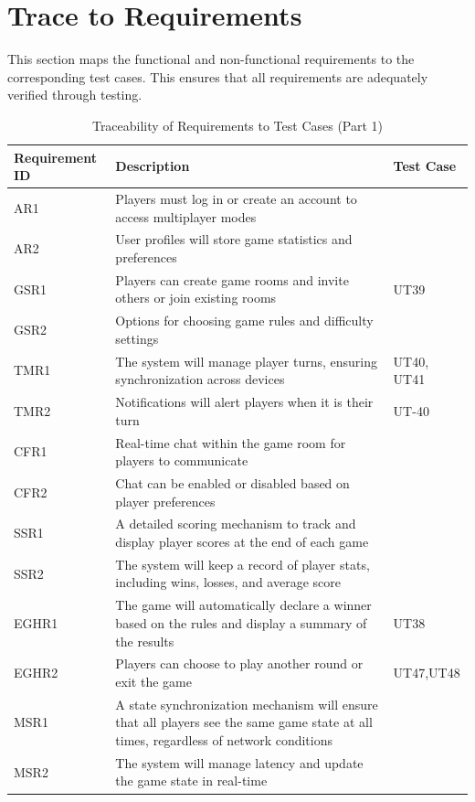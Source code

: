 \documentclass[12pt, titlepage]{article}
\begin{document}
\section{Trace to Requirements}

This section maps the functional and non-functional requirements to the corresponding test cases. This ensures that all requirements are adequately verified through testing.

\begin{table}[H]
    \centering
    \begin{tabularx}{\textwidth}{|l|X|l|}
        \hline
        \textbf{Requirement ID} & \textbf{Description} & \textbf{Test Case} \\
        \hline
        AR1 & Players must log in or create an account to access multiplayer modes &\\
        AR2 & User profiles will store game statistics and preferences &  \\
        GSR1 & Players can create game rooms and invite others or join existing rooms & UT39 \\
        GSR2 & Options for choosing game rules and difficulty settings &  \\
        TMR1 & The system will manage player turns, ensuring synchronization across devices & UT40, UT41 \\
        TMR2 & Notifications will alert players when it is their turn & UT-40 \\
        CFR1 & Real-time chat within the game room for players to communicate &  \\
        CFR2 & Chat can be enabled or disabled based on player preferences &  \\
        SSR1 & A detailed scoring mechanism to track and display player scores at the end of each game &  \\
        SSR2 & The system will keep a record of player stats, including wins, losses, and average score &  \\
        EGHR1 & The game will automatically declare a winner based on the rules and display a summary of the results & UT38 \\
        EGHR2 & Players can choose to play another round or exit the game & UT47,UT48 \\
        MSR1 & A state synchronization mechanism will ensure that all players see the same game state at all times, regardless of network conditions &  \\
        MSR2 & The system will manage latency and update the game state in real-time &  \\
        \hline
    \end{tabularx}
    \caption{Traceability of Requirements to Test Cases (Part 1)}
    \label{tab:trace_requirements_1}
\end{table}
\end{document}
